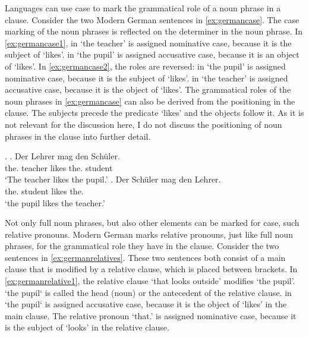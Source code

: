 Languages can use case to mark the grammatical role of a noun phrase in a clause. Consider the two Modern German sentences in \ref{ex:germancase}. The case marking of the noun phrases is reflected on the determiner in the noun phrase.
In \ref{ex:germancase1},  in  `the teacher' is assigned nominative case, because it is the subject of  `likes'.  in  `the pupil' is assigned accusative case, because it is an object of  `likes'.
In \ref{ex:germancase2}, the roles are reversed:  in  `the pupil' is assigned nominative case, because it is the subject of  `likes'.  in  `the teacher' is assigned accusative case, because it is the object of  `likes'.
The grammatical roles of the noun phrases in \ref{ex:germancase} can also be derived from the positioning in the clause. The subjects precede the predicate  `likes' and the objects follow it. As it is not relevant for the discussion here, I do not discuss the positioning of noun phrases in the clause into further detail.

\ex.\label{ex:germancase}
\ag. Der Lehrer mag den Schüler.\\
 the. teacher likes the. student\\
 `The teacher likes the pupil.'\label{ex:germancase1}
\bg. Der Schüler mag den Lehrer.\\
 the. student likes the.\\
 `the pupil likes the teacher.'\label{ex:germancase2}

Not only full noun phrases, but also other elements can be marked for case, such relative pronouns. Modern German marks relative pronouns, just like full noun phrases, for the grammatical role they have in the clause. Consider the two sentences in \ref{ex:germanrelatives}. These two sentences both consist of a main clause that is modified by a relative clause, which is placed between brackets.
In \ref{ex:germanrelative1}, the relative clause  `that looks outside' modifies  `the pupil'.  `the pupil` is called the head (noun) or the antecedent of the relative clause.  in  `the pupil` is assigned accusative case, because it is the object of  `likes' in the main clause. The relative pronoun  `that.' is assigned nominative case, because it is the subject of  `looks' in the relative clause.

